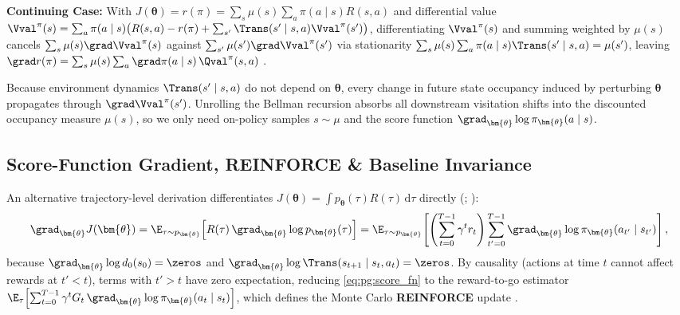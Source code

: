 \documentclass[../../../../master.tex]{subfiles}
\begin{document}
\begin{coremath}
\medskip
\noindent\textbf{Continuing Case:} With $J(\bm{\theta}) = r(\pi) = \sum_s \mu(s) \sum_a \pi(a \mid s) R(s, a)$ and differential value $\Vval^\pi(s) = \sum_a \pi(a \mid s)\big(R(s,a) - r(\pi) + \sum_{s'} \Trans(s'\mid s,a)\Vval^\pi(s')\big)$, differentiating $\Vval^\pi(s)$ and summing weighted by $\mu(s)$ cancels $\sum_s \mu(s)\grad \Vval^\pi(s)$ against $\sum_{s'} \mu(s')\grad \Vval^\pi(s')$ via stationarity $\sum_s \mu(s)\sum_a \pi(a\mid s)\Trans(s'\mid s,a) = \mu(s')$, leaving $\grad r(\pi) = \sum_s \mu(s)\sum_a \grad \pi(a \mid s)\, \Qval^\pi(s, a)$ .
\end{coremath}

\begin{intuition}
Because environment dynamics $\Trans(s' \mid s, a)$ do not depend on $\bm{\theta}$, every change in future state occupancy induced by perturbing $\bm{\theta}$ propagates through $\grad \Vval^\pi(s')$. Unrolling the Bellman recursion absorbs all downstream visitation shifts into the discounted occupancy measure $\mu(s)$, so we only need on-policy samples $s \sim \mu$ and the score function $\grad_{\bm{\theta}} \log \pi_{\bm{\theta}}(a \mid s)$.
\end{intuition}

\subsection{Score-Function Gradient, REINFORCE \& Baseline Invariance}

An alternative trajectory-level derivation differentiates $J(\bm{\theta}) = \int p_{\bm{\theta}}(\tau) R(\tau)\,\mathrm{d}\tau$ directly (; \allowbreak{}):
\begin{equation}\label{eq:pg:score_fn}
  \grad_{\bm{\theta}} J(\bm{\theta}) = \E_{\tau \sim p_{\bm{\theta}}}\!\left[ R(\tau)\, \grad_{\bm{\theta}} \log p_{\bm{\theta}}(\tau) \right]
  = \E_{\tau \sim p_{\bm{\theta}}}\!\left[ \left(\sum_{t=0}^{T-1} \gamma^t r_t\right) \sum_{t'=0}^{T-1} \grad_{\bm{\theta}} \log \pi_{\bm{\theta}}(a_{t'} \mid s_{t'}) \right],
\end{equation}
because $\grad_{\bm{\theta}} \log d_0(s_0) = \zeros$ and $\grad_{\bm{\theta}} \log \Trans(s_{t+1} \mid s_t, a_t) = \zeros$. By causality (actions at time $t$ cannot affect rewards at $t' < t$), terms with $t' > t$ have zero expectation, reducing \eqref{eq:pg:score_fn} to the reward-to-go estimator $\E_\tau\!\left[\sum_{t=0}^{T-1} \gamma^t G_t\, \grad_{\bm{\theta}} \log \pi_{\bm{\theta}}(a_t \mid s_t)\right]$, which defines the Monte Carlo \textbf{REINFORCE} update .
\end{document}
